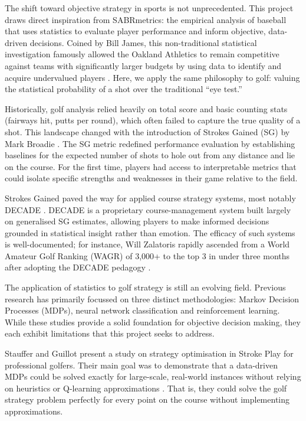 \documentclass[11pt, letterpaper]{article}
\begin{document}
The shift toward objective strategy in sports is not unprecedented. This project draws direct inspiration from SABRmetrics: the empirical analysis of baseball that uses statistics to evaluate player performance and inform objective, data-driven decisions. Coined by Bill James, this non-traditional statistical investigation famously allowed the Oakland Athletics to remain competitive against teams with significantly larger budgets by using data to identify and acquire undervalued players \parencite{moneyball_lewis}. Here, we apply the same philosophy to golf: valuing the statistical probability of a shot over the traditional ``eye test.''

Historically, golf analysis relied heavily on total score and basic counting stats (fairways hit, putts per round), which often failed to capture the true quality of a shot. This landscape changed with the introduction of Strokes Gained (SG) by Mark Broadie \parencite{Broadie_2014a}. The SG metric redefined performance evaluation by establishing baselines for the expected number of shots to hole out from any distance and lie on the course. For the first time, players had access to interpretable metrics that could isolate specific strengths and weaknesses in their game relative to the field.

Strokes Gained paved the way for applied course strategy systems, most notably DECADE \parencite{decade_golf}. DECADE is a proprietary course-management system built largely on generalised SG estimates, allowing players to make informed decisions grounded in statistical insight rather than emotion. The efficacy of such systems is well-documented; for instance, Will Zalatoris rapidly ascended from a World Amateur Golf Ranking (WAGR) of 3,000+ to the top 3 in under three months after adopting the DECADE pedagogy \parencite{decade_golf}.

The application of statistics to golf strategy is still an evolving field. Previous research has primarily focussed on three distinct methodologies: Markov Decision Processes (MDPs), neural network classification and reinforcement learning. While these studies provide a solid foundation for objective decision making, they each exhibit limitations that this project seeks to address.

Stauffer and Guillot present a study on strategy optimisation in Stroke Play for professional golfers. Their main goal was to demonstrate that a data-driven MDPs could be solved exactly for large-scale, real-world instances without relying on heuristics or Q-learning approximations \parencite{stauffer_golf_2025}. That is, they could solve the golf strategy problem perfectly for every point on the course without implementing approximations.
\end{document}
